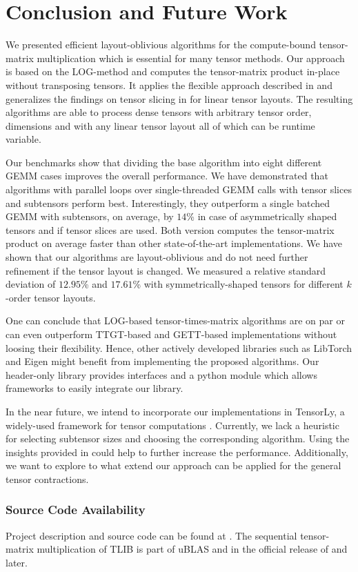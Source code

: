 \section{Conclusion and Future Work}
\label{sec:conclusion}
We presented efficient layout-oblivious algorithms for the compute-bound tensor-matrix multiplication which is essential for many tensor methods.
Our approach is based on the LOG-method and computes the tensor-matrix product in-place without transposing tensors.
It applies the flexible approach described in \cite{bassoy:2019:ttv} and generalizes the findings on tensor slicing in \cite{li:2015:input} for linear tensor layouts.
The resulting algorithms are able to process dense tensors with arbitrary tensor order, dimensions and with any linear tensor layout all of which can be runtime variable.

Our benchmarks show that dividing the base algorithm into eight different GEMM cases improves the overall performance.
We have demonstrated that algorithms with parallel loops over single-threaded GEMM calls with tensor slices and subtensors perform best.
Interestingly, they outperform a single batched GEMM with subtensors, on average, by $14$\% in case of asymmetrically shaped tensors and if tensor slices are used.
Both version computes the tensor-matrix product on average faster than other state-of-the-art implementations.
We have shown that our algorithms are layout-oblivious and do not need further refinement if the tensor layout is changed. 
We measured a relative standard deviation of $12.95$\% and $17.61$\% with symmetrically-shaped tensors for different $k$-order tensor layouts.

One can conclude that LOG-based tensor-times-matrix algorithms are on par or can even outperform TTGT-based and GETT-based implementations without loosing their flexibility.
Hence, other actively developed libraries such as LibTorch and Eigen might benefit from implementing the proposed algorithms.
Our header-only library provides  interfaces and a python module which allows frameworks to easily integrate our library.

In the near future, we intend to incorporate our implementations in TensorLy, a widely-used framework for tensor computations \cite{cohen:2022:tensor.computations, kossaifi:2019:tensorly}.
Currently, we lack a heuristic for selecting subtensor sizes and choosing the corresponding algorithm. 
Using the insights provided in \cite{li:2015:input} could help to further increase the performance.
Additionally, we want to explore to what extend our approach can be applied for the general tensor contractions.

\subsubsection{Source Code Availability}
Project description and source code can be found at .
The sequential tensor-matrix multiplication of TLIB is part of uBLAS and in the official release of   and later.
